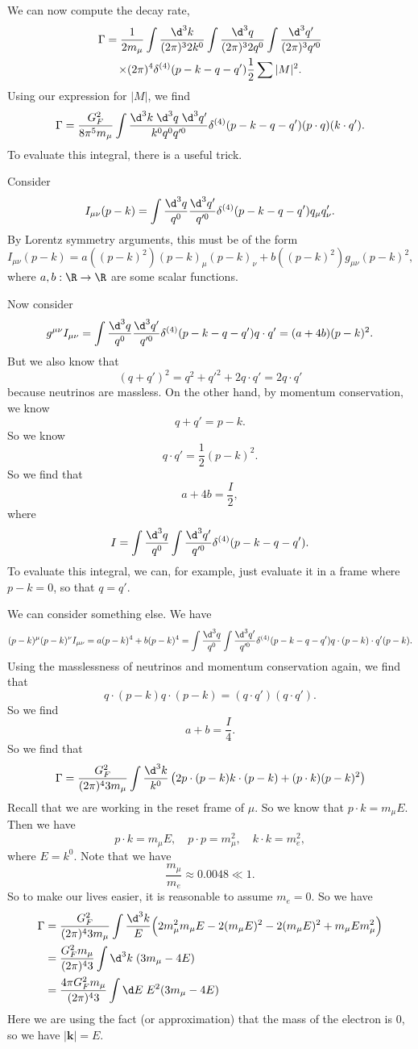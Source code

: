 \documentclass[a4paper]{article}
\begin{document}
We can now compute the decay rate,
\begin{multline*}
  \Gamma = \frac{1}{2 m_\mu} \int \frac{\d^3 k}{(2\pi)^3 2k^0} \int \frac{\d^3 q}{(2\pi)^3 2q^0} \int \frac{\d^3 q'}{(2\pi)^3 q'^0} \\
  \times (2\pi)^4 \delta^{(4)}(p - k - q - q') \frac{1}{2} \sum |M|^2.
\end{multline*}
Using our expression for $|M|$, we find
\[
  \Gamma = \frac{G_F^2}{8 \pi^5 m_\mu} \int \frac{\d^3 k\; \d^3 q\; \d^3 q'}{k^0 q^0 q'^0} \delta^{(4)} (p - k - q - q') (p \cdot q) (k \cdot q').
\]
To evaluate this integral, there is a useful trick.

Consider
\[
  I_{\mu\nu}(p - k) = \int \frac{\d^3 q}{q^0} \frac{\d^3 q'}{q'^0} \delta^{(4)}(p - k - q - q') q_\mu q'_\nu.
\]
By Lorentz symmetry arguments, this must be of the form
\[
  I_{\mu\nu} (p - k) = a((p - k)^2) (p - k)_\mu (p - k)_\nu + b((p - k)^2) g_{\mu\nu} (p - k)^2,
\]
where $a, b: \R \to \R$ are some scalar functions.

Now consider
\[
  g^{\mu\nu} I_{\mu\nu} = \int \frac{\d^3 q}{q^0} \frac{\d^3 q'}{q'^0} \delta^{(4)}(p - k - q - q') q \cdot q' = (a + 4b) (p - k)^2 .
\]
But we also know that
\[
  (q + q')^2 = q^2 + q'^2 + 2 q \cdot q' = 2 q \cdot q'
\]
because neutrinos are massless. On the other hand, by momentum conservation, we know
\[
  q + q' = p - k.
\]
So we know
\[
  q \cdot q' = \frac{1}{2} (p - k)^2.
\]
So we find that
\[
  a + 4b = \frac{I}{2},\tag{$1$}
\]
where
\[
  I = \int \frac{\d^3 q}{q^0} \int \frac{\d^3 q'}{q'^0} \delta^{(4)} (p - k - q - q').
\]
To evaluate this integral, we can, for example, just evaluate it in a frame where $p - k = 0$, so that $q = q'$. %

We can consider something else. We have
\[
  (p - k)^\mu (p - k)^\nu I_{\mu\nu} = a(p - k)^4 + b(p - k)^4 = \int \frac{\d^3 q}{q^0} \int \frac{\d^3 q'}{q'^0} \delta^{(4)} (p - k - q - q') q\cdot (p - k) \cdot q' (p - k).
\]
Using the masslessness of neutrinos and momentum conservation again, we find that
\[
  q \cdot (p - k) q \cdot (p - k) = (q \cdot q') (q \cdot q').
\]
So we find
\[
  a + b = \frac{I}{4}\tag{$2$}.
\]
So we find that
\[
  \Gamma = \frac{G_F^2}{(2\pi)^4 3m_\mu} \int \frac{\d^3 k}{k^0} \left(2 p \cdot (p - k) k \cdot (p - k) + (p \cdot k)(p - k)^2\right)
\]
Recall that we are working in the reset frame of $\mu$. So we know that $p \cdot k = m_\mu E$. Then we have
\[
  p \cdot k = m_\mu E,\quad p \cdot p = m_\mu^2,\quad k \cdot k = m_e^2,
\]
where $E = k^0$. Note that we have
\[
  \frac{m_\mu}{m_e}\approx 0.0048 \ll 1.
\]
So to make our lives easier, it is reasonable to assume $m_e = 0$. So we have
\begin{align*}
  \Gamma &= \frac{G_F^2}{(2\pi)^4 3m_\mu} \int \frac{\d^3 k}{E} \Big(2 m_\mu^2 m_\mu E - 2 (m_\mu E)^2 - 2 (m_\mu E)^2 + m_\mu E m_\mu^2\Big)\\
  &= \frac{G_F^2 m_\mu}{ (2\pi)^4 3} \int \d^3 k\; (3 m_\mu - 4 E)\\
  &= \frac{4\pi G_F^2 m_\mu}{(2\pi)^4 3} \int \d E\; E^2(3 m_\mu - 4E)
\end{align*}
Here we are using the fact (or approximation) that the mass of the electron is $0$, so we have $|\mathbf{k}| = E$.
\end{document}
